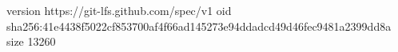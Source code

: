 version https://git-lfs.github.com/spec/v1
oid sha256:41e4438f5022cf853700af4f66ad145273e94ddadcd49d46fec9481a2399dd8a
size 13260
